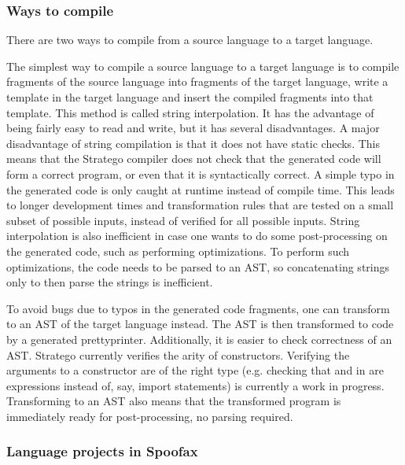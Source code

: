 \subsubsection{Ways to compile}
\label{subsubsec:problem_analysis__background__ways_to_compile}

There are two ways to compile from a source language to a target language.

The simplest way to compile a source language to a target language is to compile fragments of the source language into fragments of the target language, write a template in the target language and insert the compiled fragments into that template.
This method is called string interpolation.
It has the advantage of being fairly easy to read and write, but it has several disadvantages.
A major disadvantage of string compilation is that it does not have static checks.
This means that the Stratego compiler  does not check that the generated code will form a correct program, or even that it is syntactically correct.
A simple typo in the generated code is only caught at runtime instead of compile time.
This leads to longer development times and transformation rules that are tested on a small subset of possible inputs, instead of verified for all possible inputs.
String interpolation is also inefficient in case one wants to do some post-processing on the generated code, such as performing optimizations.
To perform such optimizations, the code needs to be parsed to an AST, so concatenating strings only to then parse the strings is inefficient.

To avoid bugs due to typos in the generated code fragments, one can transform to an \ac{AST} of the target language instead.
The \ac{AST} is then transformed to code by a generated prettyprinter.
Additionally, it is easier to check correctness of an \ac{AST}.
Stratego currently verifies the arity of constructors.
Verifying the arguments to a constructor are of the right type (e.g. checking that  and  in  are expressions instead of, say, import statements) is currently a work in progress.
Transforming to an \ac{AST} also means that the transformed program is immediately ready for post-processing, no parsing required.

\subsubsection{Language projects in Spoofax}
\label{subsubsec:problem_analysis__background__spoofax_language_projects}

